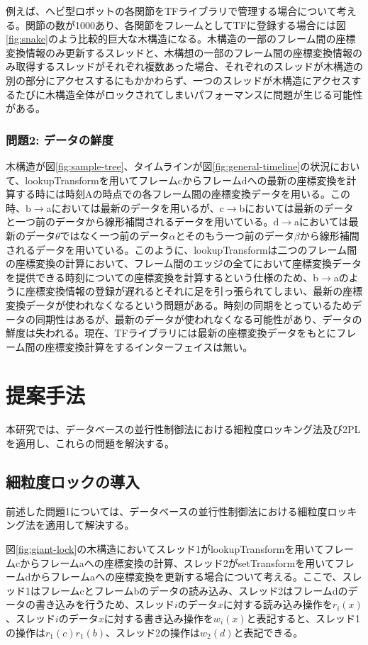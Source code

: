 \documentclass[a4paper]{jreport}	%
\begin{document}
例えば、ヘビ型ロボットの各関節をTFライブラリで管理する場合について考える。関節の数が1000あり、各関節をフレームとしてTFに登録する場合には図\ref{fig:snake}のよう比較的巨大な木構造になる。木構造の一部のフレーム間の座標変換情報のみ更新するスレッドと、木構想の一部のフレーム間の座標変換情報のみ取得するスレッドがそれぞれ複数あった場合、それぞれのスレッドが木構造の別の部分にアクセスするにもかかわらず、一つのスレッドが木構造にアクセスするたびに木構造全体がロックされてしまいパフォーマンスに問題が生じる可能性がある。

\subsection*{問題2: データの鮮度}
木構造が図\ref{fig:sample-tree}、タイムラインが図\ref{fig:general-timeline}の状況において、lookupTransformを用いてフレームcからフレームdへの最新の座標変換を計算する時には時刻Aの時点での各フレーム間の座標変換データを用いる。この時、b$\rightarrow$aにおいては最新のデータを用いるが、c$\rightarrow$bにおいては最新のデータと一つ前のデータから線形補間されるデータを用いている。d$\rightarrow$aにおいては最新のデータ$\theta$ではなく一つ前のデータ$\alpha$とそのもう一つ前のデータ$\beta$から線形補間されるデータを用いている。このように、lookupTransformは二つのフレーム間の座標変換の計算において、フレーム間のエッジの全てにおいて座標変換データを提供できる時刻についての座標変換を計算するという仕様のため、b$\rightarrow$aのように座標変換情報の登録が遅れるとそれに足を引っ張られてしまい、最新の座標変換データが使われなくなるという問題がある。時刻の同期をとっているためデータの同期性はあるが、最新のデータが使われなくなる可能性があり、データの鮮度は失われる。現在、TFライブラリには最新の座標変換データをもとにフレーム間の座標変換計算をするインターフェイスは無い。

\chapter{提案手法}
本研究では、データベースの並行性制御法における細粒度ロッキング法及び2PLを適用し、これらの問題を解決する。

\section{細粒度ロックの導入}
\label{section:intro-high-gran-lock}

前述した問題1については、データベースの並行性制御法における細粒度ロッキング法を適用して解決する。

図\ref{fig:giant-lock}の木構造においてスレッド1がlookupTransformを用いてフレームcからフレームaへの座標変換の計算、スレッド2がsetTransformを用いてフレームdからフレームaへの座標変換を更新する場合について考える。ここで、スレッド1はフレームcとフレームbのデータの読み込み、スレッド2はフレームdのデータの書き込みを行うため、スレッド$i$のデータ$x$に対する読み込み操作を$r_i(x)$、スレッド$i$のデータ$x$に対する書き込み操作を$w_i(x)$と表記すると、スレッド1の操作は$r_1(c)r_1(b)$、スレッド2の操作は$w_2(d)$と表記できる。
\end{document}
